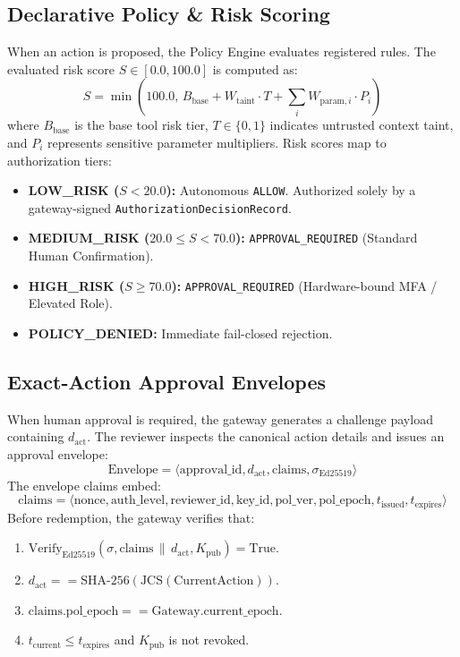 \documentclass[sigconf,anonymous,review]{acmart}
\begin{document}
\subsection{Declarative Policy \& Risk Scoring}
When an action is proposed, the Policy Engine evaluates registered rules. The evaluated risk score $S \in [0.0, 100.0]$ is computed as:
\begin{equation}
S = \min\left(100.0, \, B_{\text{base}} + W_{\text{taint}} \cdot T + \sum_i W_{\text{param}, i} \cdot P_i\right)
\end{equation}
where $B_{\text{base}}$ is the base tool risk tier, $T \in \{0, 1\}$ indicates untrusted context taint, and $P_i$ represents sensitive parameter multipliers. Risk scores map to authorization tiers:
\begin{itemize}
    \item \textbf{LOW\_RISK ($S < 20.0$):} Autonomous \texttt{ALLOW}. Authorized solely by a gateway-signed \texttt{AuthorizationDecisionRecord}.
    \item \textbf{MEDIUM\_RISK ($20.0 \le S < 70.0$):} \texttt{APPROVAL\_REQUIRED} (Standard Human Confirmation).
    \item \textbf{HIGH\_RISK ($S \ge 70.0$):} \texttt{APPROVAL\_REQUIRED} (Hardware-bound MFA / Elevated Role).
    \item \textbf{POLICY\_DENIED:} Immediate fail-closed rejection.
\end{itemize}

\subsection{Exact-Action Approval Envelopes}
When human approval is required, the gateway generates a challenge payload containing $d_{\text{act}}$. The reviewer inspects the canonical action details and issues an approval envelope:
\begin{equation}
\text{Envelope} = \langle \text{approval\_id}, d_{\text{act}}, \text{claims}, \sigma_{\text{Ed25519}} \rangle
\end{equation}
The envelope claims embed:
\begin{equation}
\text{claims} = \langle \text{nonce}, \text{auth\_level}, \text{reviewer\_id}, \text{key\_id}, \text{pol\_ver}, \text{pol\_epoch}, t_{\text{issued}}, t_{\text{expires}} \rangle
\end{equation}
Before redemption, the gateway verifies that:
\begin{enumerate}
    \item $\text{Verify}_{\text{Ed25519}}(\sigma, \text{claims} \,\|\, d_{\text{act}}, K_{\text{pub}}) = \text{True}$.
    \item $d_{\text{act}} == \text{SHA-256}(\text{JCS}(\text{CurrentAction}))$.
    \item $\text{claims.pol\_epoch} == \text{Gateway.current\_epoch}$.
    \item $t_{\text{current}} \le t_{\text{expires}}$ and $K_{\text{pub}}$ is not revoked.
\end{enumerate}
\end{document}
